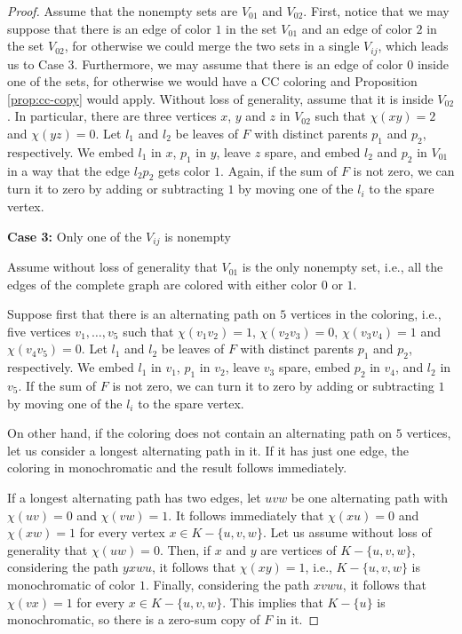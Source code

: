 \documentclass[10pt,a4paper]{amsart}
\begin{document}
\begin{proof}
    Assume that the nonempty sets are $V_{01}$ and $V_{02}$. First, notice that we may suppose that there is an edge of color $1$ in the set $V_{01}$ and an edge of color $2$ in the set $V_{02}$, for otherwise we could merge the two sets in a single $V_{ij}$, which leads us to Case 3. Furthermore, we may assume that there is an edge of color $0$ inside one of the sets, for otherwise we would have a CC coloring and Proposition \ref{prop:cc-copy} would apply. Without loss of generality, assume that it is inside $V_{02}$. In particular, there are three vertices $x$, $y$ and $z$ in $V_{02}$ such that $\chi(xy)=2$ and $\chi(yz)=0$. Let $l_1$ and $l_2$ be leaves of $F$ with distinct parents $p_1$ and $p_2$, respectively. We embed $l_1$ in $x$, $p_1$ in $y$, leave $z$ spare, and embed $l_2$ and $p_2$ in $V_{01}$ in a way that the edge $l_2p_2$ gets color $1$. Again, if the sum of $F$ is not zero, we can turn it to zero by adding or subtracting $1$ by moving one of the $l_i$ to the spare vertex.

    \medskip

    \textbf{Case 3:} Only one of the $V_{ij}$ is nonempty

    Assume without loss of generality that $V_{01}$ is the only nonempty set, i.e., all the edges of the complete graph are colored with either color $0$ or $1$.

    Suppose first that there is an alternating path on $5$ vertices in the coloring, i.e., five vertices $v_1, \dots, v_5$ such that $\chi(v_1v_2)=1$, $\chi(v_2v_3)=0$, $\chi(v_3v_4)=1$ and $\chi(v_4v_5)=0$. Let $l_1$ and $l_2$ be leaves of $F$ with distinct parents $p_1$ and $p_2$, respectively. We embed $l_1$ in $v_1$, $p_1$ in $v_2$, leave $v_3$ spare, embed $p_2$ in $v_4$, and $l_2$ in $v_5$. If the sum of $F$ is not zero, we can turn it to zero by adding or subtracting $1$ by moving one of the $l_i$ to the spare vertex.

    On other hand, if the coloring does not contain an alternating path on $5$ vertices, let us consider a longest alternating path in it. If it has just one edge, the coloring in monochromatic and the result follows immediately.

    If a longest alternating path has two edges, let $uvw$ be one alternating path with $\chi(uv)=0$ and $\chi(vw)=1$. It follows immediately that $\chi(xu)=0$ and $\chi(xw)=1$ for every vertex $x \in K-\{u,v,w\}$. Let us assume without loss of generality that $\chi(uw)=0$. Then, if $x$ and $y$ are vertices of $K-\{u,v,w\}$, considering the path $yxwu$, it follows that $\chi(xy)=1$, i.e., $K-\{u,v,w\}$ is monochromatic of color $1$. Finally, considering the path $xvwu$, it follows that $\chi(vx)=1$ for every $x \in K-\{u,v,w\}$. This implies that $K-\{u\}$ is monochromatic, so there is a zero-sum copy of $F$ in it. 


\end{proof}
\end{document}

